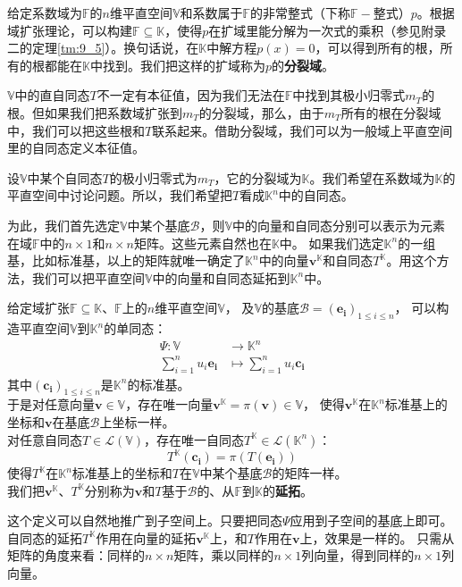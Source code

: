 \documentclass[12pt,UTF8]{ctexbook}
\begin{document}
给定系数域为$\mathbb{F}$的$n$维平直空间$\mathbb{V}$和系数属于$\mathbb{F}$的非常整式（下称$\mathbb{F}-$整式）$p$。根据域扩张理论，可以构建$\mathbb{F}\subseteq \mathbb{K}$，使得$p$在扩域里能分解为一次式的乘积（参见附录二的定理\ref{tm:9_5}）。换句话说，在$\mathbb{K}$中解方程$p(x)=0$，可以得到所有的根，所有的根都能在$\mathbb{K}$中找到。我们把这样的扩域称为$p$的\textbf{分裂域}。

$\mathbb{V}$中的直自同态$T$不一定有本征值，因为我们无法在$\mathbb{F}$中找到其极小归零式$m_T$的根。但如果我们把系数域扩张到$m_T$的分裂域，那么，由于$m_T$所有的根在分裂域中，我们可以把这些根和$T$联系起来。借助分裂域，我们可以为一般域上平直空间里的自同态定义本征值。

设$\mathbb{V}$中某个自同态$T$的极小归零式为$m_T$，它的分裂域为$\mathbb{K}$。我们希望在系数域为$\mathbb{K}$的平直空间中讨论问题。所以，我们希望把$T$看成$\mathbb{K}^n$中的自同态。

为此，我们首先选定$\mathbb{V}$中某个基底$\mathcal{B}$，则$\mathbb{V}$中的向量和自同态分别可以表示为元素在域$\mathbb{F}$中的$n\times 1$和$n\times n$矩阵。这些元素自然也在$\mathbb{K}$中。
如果我们选定$\mathbb{K}^n$的一组基，比如标准基，以上的矩阵就唯一确定了$\mathbb{K}^n$中的向量$\mathbf{v}^\mathbb{K}$和自同态$T^{\mathbb{K}}$。用这个方法，我们可以把平直空间$\mathbb{V}$中的向量和自同态延拓到$\mathbb{K}^n$中。

\begin{df}\label{df:9_3}
    给定域扩张$\mathbb{F}\subseteq\mathbb{K}$、$\mathbb{F}$上的$n$维平直空间$\mathbb{V}$，
    及$\mathbb{V}$的基底$\mathcal{B} = (\mathbf{e_i})_{1\leqslant i \leqslant n}$，
    可以构造平直空间$\mathbb{V}$到$\mathbb{K}^n$的单同态：
    \begin{align*}
        \Psi : \mathbb{V} &\rightarrow \mathbb{K}^n  \\
        \sum_{i=1}^n u_i\mathbf{e_i} &\mapsto  \sum_{i=1}^n u_i\mathbf{c_i} 
    \end{align*}
    其中$(\mathbf{c_i})_{1\leqslant i \leqslant n}$是$\mathbb{K}^n$的标准基。\\
    于是对任意向量$\mathbf{v} \in \mathbb{V}$，存在唯一向量$\mathbf{v}^\mathbb{K} = \pi(\mathbf{v})\in \mathbb{V}$，
    使得$\mathbf{v}^\mathbb{K}$在$\mathbb{K}^n$标准基上的坐标和$\mathbf{v}$在基底$\mathcal{B}$上坐标一样。\\
    对任意自同态$T \in \mathcal{L}(\mathbb{V})$，存在唯一自同态$T^{\mathbb{K}} \in \mathcal{L}(\mathbb{K}^n)$：
    $$ T^{\mathbb{K}}(\mathbf{c_i}) = \pi\left(T(\mathbf{e_i})\right) $$
    使得$T^{\mathbb{K}}$在$\mathbb{K}^n$标准基上的坐标和$T$在$\mathbb{V}$中某个基底$\mathcal{B}$的矩阵一样。\\
    我们把$\mathbf{v}^\mathbb{K}$、$T^{\mathbb{K}}$分别称为$\mathbf{v}$和$T$基于$\mathcal{B}$的、从$\mathbb{F}$到$\mathbb{K}$的\textbf{延拓}。
\end{df}
这个定义可以自然地推广到子空间上。只要把同态$\Psi$应用到子空间的基底上即可。
自同态的延拓$T^{\mathbb{K}}$作用在向量的延拓$\mathbf{v}^{\mathbb{K}}$上，和$T$作用在$\mathbf{v}$上，效果是一样的。
只需从矩阵的角度来看：同样的$n\times n$矩阵，乘以同样的$n\times 1$列向量，得到同样的$n\times 1$列向量。
\end{document}
